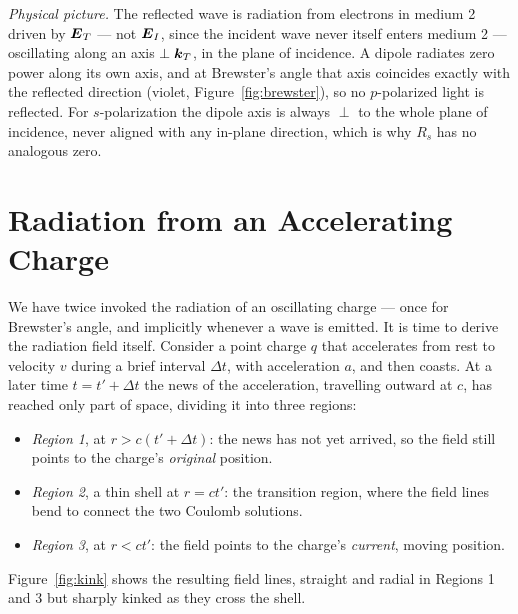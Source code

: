 \emph{Physical picture.} The reflected wave is radiation from electrons in medium 2 driven by $\vect{E}_T$ --- not $\vect{E}_I$, since the incident wave never itself enters medium 2 --- oscillating along an axis $\perp\bm{k}_T$, in the plane of incidence. A dipole radiates zero power along its own axis, and at Brewster's angle that axis coincides exactly with the reflected direction (violet, Figure~\ref{fig:brewster}), so no $p$-polarized light is reflected. For $s$-polarization the dipole axis is always $\perp$ to the whole plane of incidence, never aligned with any in-plane direction, which is why $R_s$ has no analogous zero.

\section{Radiation from an Accelerating Charge}

We have twice invoked the radiation of an oscillating charge --- once for Brewster's angle, and implicitly whenever a wave is emitted. It is time to derive the radiation field itself. Consider a point charge $q$ that accelerates from rest to velocity $v$ during a brief interval $\Delta t$, with acceleration $a$, and then coasts. At a later time $t = t' + \Delta t$ the news of the acceleration, travelling outward at $c$, has reached only part of space, dividing it into three regions:
\begin{itemize}
    \item \emph{Region 1}, at $r > c(t' + \Delta t)$: the news has not yet arrived, so the field still points to the charge's \emph{original} position.
    \item \emph{Region 2}, a thin shell at $r = ct'$: the transition region, where the field lines bend to connect the two Coulomb solutions.
    \item \emph{Region 3}, at $r < ct'$: the field points to the charge's \emph{current}, moving position.
\end{itemize}
Figure~\ref{fig:kink} shows the resulting field lines, straight and radial in Regions 1 and 3 but sharply kinked as they cross the shell.

